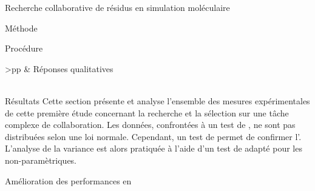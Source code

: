 \documentclass[myfrancais]{mythesis}
\begin{document}
\begin{mychapter}{Recherche collaborative de résidus en simulation moléculaire}
\begin{mysection}{Méthode}
\begin{mysubsection}{Procédure}
\begin{mytable}
\begin{mytabular}{>{\bfseries}p{\exponefirstcolumn}p{\exponesecondcolumn}}
																	&  Réponses qualitatives                                             \\
						\mymiddlerule[\heavyrulewidth]
						 \\
						\mybottomrule
					\end{mytabular}
				\end{mytable}
			\end{mysubsection}
		\end{mysection}
		\begin{mysection}{Résultats}
			Cette section présente et analyse l'ensemble des mesures expérimentales de cette première étude concernant la recherche et la sélection sur une tâche complexe de collaboration.
			Les données, confrontées à un test de , ne sont pas distribuées selon une loi normale.
			Cependant, un test de  permet de confirmer l'.
			L'analyse de la variance est alors pratiquée à l'aide d'un test de  adapté pour les  non-paramètriques.
			\begin{mysubsection}{Amélioration des performances en }

\end{mysubsection}
\end{mysection}
\end{mychapter}
\end{document}
